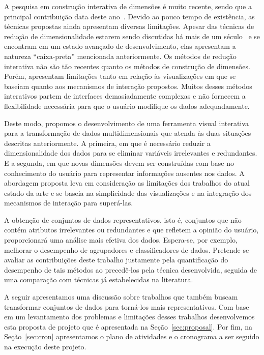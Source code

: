 A pesquisa em construção interativa de dimensões é muito
recente, sendo que a principal contribuição data deste
ano~\cite{Gladys2013}. Devido ao pouco tempo de existência,
as técnicas propostas ainda apresentam diversas limitações.
Apesar das técnicas de redução de dimensionalidade estarem
sendo discutidas há mais de um século~\cite{Pearson1901} e
se encontram em um estado avançado de desenvolvimento, elas
apresentam a natureza ``caixa-preta'' mencionada
anteriormente.  Os métodos de redução interativa não são tão
recentes quanto os métodos de construção de dimensões.
Porém, apresentam limitações tanto em relação às
visualizações em que se baseiam quanto aos mecanismos de
interação propostos.  Muitos desses métodos interativos
partem de interfaces demasiadamente complexas e não fornecem
a flexibilidade necessária para que o usuário modifique os
dados adequadamente.

Deste modo, propomos o desenvolvimento de uma ferramenta
visual interativa para a transformação de dados
multidimensionais que atenda às duas situações descritas
anteriormente. A primeira, em que é necessário reduzir a
dimensionalidade dos dados para se eliminar variáveis
irrelevantes e redundantes. E a segunda, em que novas
dimensões devem ser construídas com base no conhecimento do
usuário para representar informações ausentes nos dados. A
abordagem proposta leva em consideração as limitações dos
trabalhos do atual estado da arte e se baseia na
simplicidade das visualizações e na integração  dos
mecanismos de interação para superá-las. 

A obtenção de conjuntos de dados representativos, isto é,
conjuntos que não contém atributos irrelevantes ou
redundantes e que refletem a opinião do usuário,
proporcionará uma análise mais efetiva dos dados. Espera-se,
por exemplo, melhorar o desempenho de agrupadores e
classificadores de dados. Pretende-se avaliar as
contribuições deste trabalho justamente pela quantificação
do desempenho de tais métodos ao precedê-los pela técnica
desenvolvida, seguida de uma comparação com técnicas já
estabelecidas na literatura.

A seguir apresentamos uma
discussão sobre trabalhos que também buscam transformar
conjuntos de dados para torná-los mais representativos. Com
base em um levantamento dos problemas e limitações desses
trabalhos desenvolvemos esta proposta de projeto que é
apresentada na Seção~\ref{sec:proposal}. Por fim, na
Seção~\ref{sec:cron} apresentamos o plano de atividades e o
cronograma a ser seguido na execução deste projeto.
